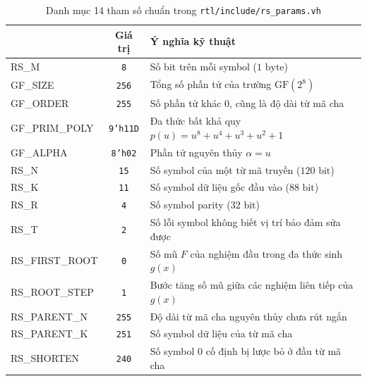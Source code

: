 \documentclass[12pt,a4paper]{report}
\begin{document}
\begin{table}[!htb]
    \centering
    \caption{Danh mục 14 tham số chuẩn trong \texttt{rtl/include/rs\_params.vh}}
    \label{tab:rs-14-params}
    \small
    \begin{tabularx}{\textwidth}{@{}>{\ttfamily}l c X@{}}
        \toprule
        \multicolumn{1}{@{}l}{\textbf{Macro trong header}} & \textbf{Giá trị} & \textbf{Ý nghĩa kỹ thuật} \\
        \midrule
        RS\_M          & \texttt{8}       & Số bit trên mỗi symbol ($1\text{ byte}$) \\
        GF\_SIZE       & \texttt{256}     & Tổng số phần tử của trường $\text{GF}(2^8)$ \\
        GF\_ORDER      & \texttt{255}     & Số phần tử khác $0$, cũng là độ dài từ mã cha \\
        GF\_PRIM\_POLY & \texttt{9'h11D}  & Đa thức bất khả quy $p(u) = u^8 + u^4 + u^3 + u^2 + 1$ \\
        GF\_ALPHA      & \texttt{8'h02}   & Phần tử nguyên thủy $\alpha = u$ \\
        RS\_N          & \texttt{15}      & Số symbol của một từ mã truyền ($120\text{ bit}$) \\
        RS\_K          & \texttt{11}      & Số symbol dữ liệu gốc đầu vào ($88\text{ bit}$) \\
        RS\_R          & \texttt{4}       & Số symbol parity ($32\text{ bit}$) \\
        RS\_T          & \texttt{2}       & Số lỗi symbol không biết vị trí bảo đảm sửa được \\
        RS\_FIRST\_ROOT & \texttt{0}      & Số mũ $F$ của nghiệm đầu trong đa thức sinh $g(x)$ \\
        RS\_ROOT\_STEP & \texttt{1}       & Bước tăng số mũ giữa các nghiệm liên tiếp của $g(x)$ \\
        RS\_PARENT\_N  & \texttt{255}     & Độ dài từ mã cha nguyên thủy chưa rút ngắn \\
        RS\_PARENT\_K  & \texttt{251}     & Số symbol dữ liệu của từ mã cha \\
        RS\_SHORTEN    & \texttt{240}     & Số symbol $0$ cố định bị lược bỏ ở đầu từ mã cha \\
        \bottomrule
    \end{tabularx}
\end{table}
\end{document}
